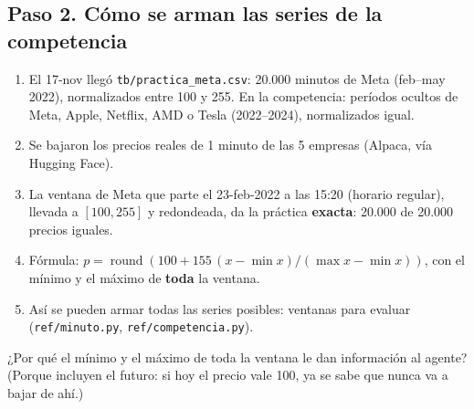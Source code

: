 \documentclass[11pt,letterpaper]{article}
\begin{document}
\subsection*{Paso 2. Cómo se arman las series de la competencia}
\begin{enumerate}
\item El 17-nov llegó \texttt{tb/practica\_meta.csv}: 20.000 minutos de Meta (feb--may 2022),
  normalizados entre 100 y 255. En la competencia: períodos ocultos de Meta, Apple, Netflix, AMD o Tesla
  (2022--2024), normalizados igual.
\item Se bajaron los precios reales de 1 minuto de las 5 empresas (Alpaca, vía Hugging Face).
\item La ventana de Meta que parte el 23-feb-2022 a las 15:20 (horario regular), llevada a $[100,255]$
  y redondeada, da la práctica \textbf{exacta}: 20.000 de 20.000 precios iguales.
\item Fórmula: $p = \operatorname{round}(100 + 155\,(x - \min x)/(\max x - \min x))$, con el mínimo y
  el máximo de \textbf{toda} la ventana.
\item Así se pueden armar todas las series posibles: \NVentanas{} ventanas para evaluar
  (\texttt{ref/minuto.py}, \texttt{ref/competencia.py}).
\end{enumerate}
\begin{checkpoint}
¿Por qué el mínimo y el máximo de toda la ventana le dan información al agente? (Porque incluyen el
futuro: si hoy el precio vale 100, ya se sabe que nunca va a bajar de ahí.)
\end{checkpoint}
\end{document}

